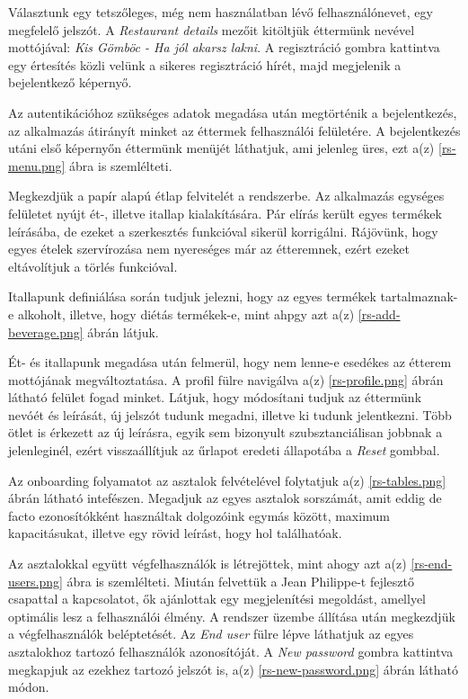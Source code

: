 Választunk egy tetszőleges, még nem használatban lévő felhasználónevet, egy megfelelő jelszót. A \emph{Restaurant details} mezőit kitöltjük éttermünk nevével mottójával: \emph{Kis Gömböc - Ha jól akarsz lakni}. A regisztráció gombra kattintva egy értesítés közli velünk a sikeres regisztráció hírét, majd megjelenik a bejelentkező képernyő.


Az autentikációhoz szükséges adatok megadása után megtörténik a bejelentkezés, az alkalmazás átirányít minket az éttermek felhasználói felületére. A bejelentkezés utáni első képernyőn éttermünk menüjét láthatjuk, ami jelenleg üres, ezt a(z) \ref{rs-menu.png} ábra is szemlélteti.


Megkezdjük a papír alapú étlap felvitelét a rendszerbe. Az alkalmazás egységes felületet nyújt ét-, illetve itallap kialakítására. Pár elírás került egyes termékek leírásába, de ezeket a szerkesztés funkcióval sikerül korrigálni. Rájövünk, hogy egyes ételek szervírozása nem nyereséges már az étteremnek, ezért ezeket eltávolítjuk a törlés funkcióval.


Itallapunk definiálása során tudjuk jelezni, hogy az egyes termékek tartalmaznak-e alkoholt, illetve, hogy diétás termékek-e, mint ahpgy azt a(z) \ref{rs-add-beverage.png} ábrán látjuk.

Ét- és itallapunk megadása után felmerül, hogy nem lenne-e esedékes az étterem mottójának megváltoztatása. A profil fülre navigálva a(z) \ref{rs-profile.png} ábrán látható felület fogad minket. Látjuk, hogy módosítani tudjuk az éttermünk nevóét és leírását, új jelszót tudunk megadni, illetve ki tudunk jelentkezni. Több ötlet is érkezett az új leírásra, egyik sem bizonyult szubsztanciálisan jobbnak a jelenleginél, ezért visszaállítjuk az űrlapot eredeti állapotába a \emph{Reset} gombbal.

Az onboarding folyamatot az asztalok felvételével folytatjuk a(z) \ref{rs-tables.png} ábrán látható intefészen. Megadjuk az egyes asztalok sorszámát, amit eddig de facto ezonosítókként használtak dolgozóink egymás között, maximum kapacitásukat, illetve egy rövid leírást, hogy hol találhatóak.


Az asztalokkal együtt végfelhasználók is létrejöttek, mint ahogy azt a(z) \ref{rs-end-users.png} ábra is szemlélteti. Miután felvettük a Jean Philippe-t fejlesztő csapattal a kapcsolatot, ők ajánlottak egy megjelenítési megoldást, amellyel optimális lesz a felhasználói élmény. A rendszer üzembe állítása után megkezdjük a végfelhasználók beléptetését. Az \emph{End user} fülre lépve láthatjuk az egyes asztalokhoz tartozó felhasználók azonosítóját. A \emph{New password} gombra kattintva megkapjuk az ezekhez tartozó jelszót is, a(z) \ref{rs-new-password.png} ábrán látható módon.


